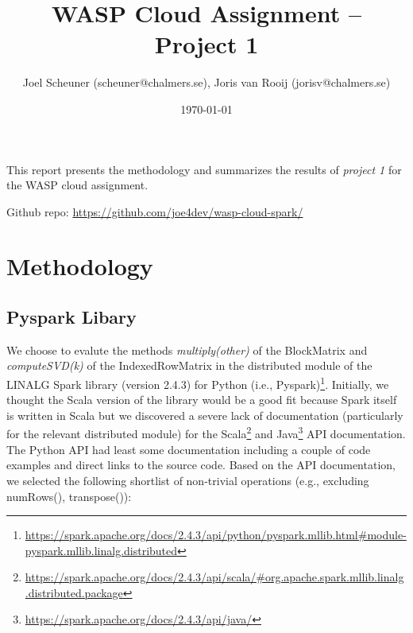 \documentclass{prog_report}
\newcommand{\footurl}[1]{\footnote{\url{#1}}}
\begin{document}
\title{WASP Cloud Assignment – Project 1}

\author{Joel Scheuner (scheuner@chalmers.se), Joris van Rooij (jorisv@chalmers.se)}

\date{\today}

\maketitle

%

This report presents the methodology and summarizes the results of \emph{project 1} for the WASP cloud assignment.

Github repo: \url{https://github.com/joe4dev/wasp-cloud-spark/}

\section{Methodology}

\subsection{Pyspark Libary}
We choose to evalute the methods \emph{multiply(other)} of the BlockMatrix and \emph{computeSVD(k)} of the IndexedRowMatrix in the distributed module of the LINALG Spark library (version 2.4.3) for Python (i.e., Pyspark)\footurl{https://spark.apache.org/docs/2.4.3/api/python/pyspark.mllib.html\#module-pyspark.mllib.linalg.distributed}.
Initially, we thought the Scala version of the library would be a good fit because Spark itself is written in Scala but we discovered a severe lack of documentation (particularly for the relevant distributed module) for the Scala\footurl{https://spark.apache.org/docs/2.4.3/api/scala/\#org.apache.spark.mllib.linalg.distributed.package} and Java\footurl{https://spark.apache.org/docs/2.4.3/api/java/} API documentation.
The Python API had least some documentation including a couple of code examples and direct links to the source code.
Based on the API documentation, we selected the following shortlist of non-trivial operations (e.g., excluding numRows(), transpose()):
\end{document}
